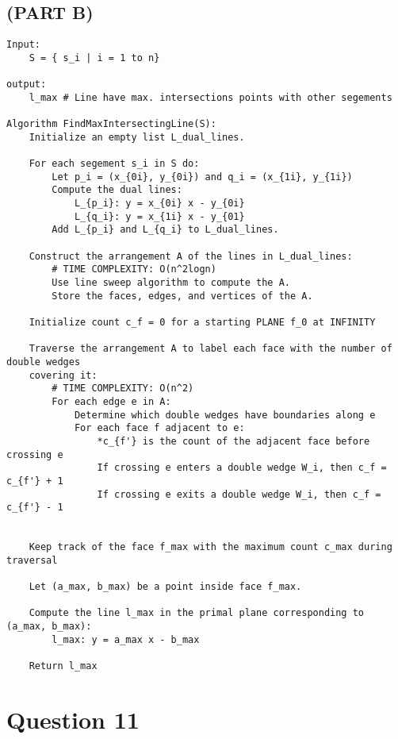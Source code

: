 \documentclass{article}
\begin{document}
\subsection*{(PART B)}
\begin{verbatim}
Input:
    S = { s_i | i = 1 to n}

output:
    l_max # Line have max. intersections points with other segements

Algorithm FindMaxIntersectingLine(S): 
    Initialize an empty list L_dual_lines.

    For each segement s_i in S do:
        Let p_i = (x_{0i}, y_{0i}) and q_i = (x_{1i}, y_{1i})
        Compute the dual lines:
            L_{p_i}: y = x_{0i} x - y_{0i}
            L_{q_i}: y = x_{1i} x - y_{01}
        Add L_{p_i} and L_{q_i} to L_dual_lines.

    Construct the arrangement A of the lines in L_dual_lines:
        # TIME COMPLEXITY: O(n^2logn)
        Use line sweep algorithm to compute the A.
        Store the faces, edges, and vertices of the A.

    Initialize count c_f = 0 for a starting PLANE f_0 at INFINITY

    Traverse the arrangement A to label each face with the number of double wedges 
    covering it: 
        # TIME COMPLEXITY: O(n^2)
        For each edge e in A:
            Determine which double wedges have boundaries along e
            For each face f adjacent to e:
                *c_{f'} is the count of the adjacent face before crossing e
                If crossing e enters a double wedge W_i, then c_f = c_{f'} + 1
                If crossing e exits a double wedge W_i, then c_f = c_{f'} - 1
    

    Keep track of the face f_max with the maximum count c_max during traversal
    
    Let (a_max, b_max) be a point inside face f_max.

    Compute the line l_max in the primal plane corresponding to (a_max, b_max):
        l_max: y = a_max x - b_max

    Return l_max

\end{verbatim}

\section*{Question 11}
\end{document}
